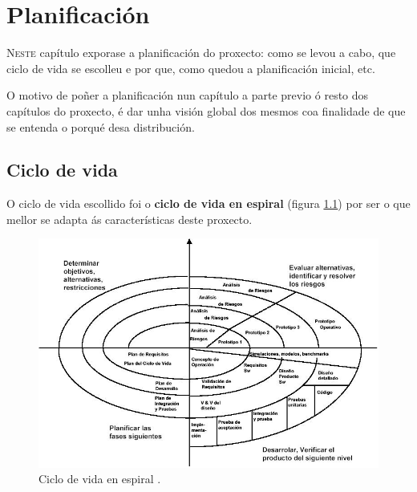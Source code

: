 \chapter{Planificación}
\minitoc
\label{chap:planificacion}
\vspace{0.5cm}


\lettrine{N}{este} capítulo exporase a planificación do proxecto: como se levou a
cabo, que ciclo de vida se escolleu e por que, como quedou a planificación
inicial, etc.

O motivo de poñer a planificación nun capítulo a parte previo ó resto dos
capítulos do proxecto, é dar unha visión global dos mesmos coa finalidade de
que se entenda o porqué desa distribución.

\section{Ciclo de vida}

O ciclo de vida escollido foi o \textbf{ciclo de vida en espiral}
\cite{TemarioES} (figura \ref{figura:CicloVidaEspiral}) por ser o que mellor se
adapta ás características deste proxecto.

\begin{figure}[htbp]
 \centering
 \includegraphics[scale=0.6,keepaspectratio=true]{./imagenes/espiral.jpg}
 \caption[Ciclo de vida en espiral]{Ciclo de vida en espiral \cite{TemarioES}.}
 \label{figura:CicloVidaEspiral}
\end{figure}


